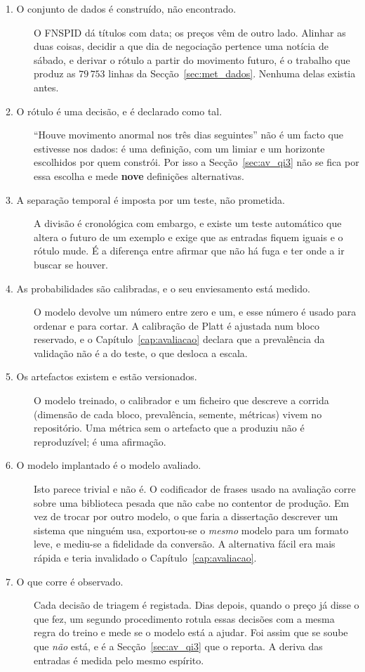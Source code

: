 \begin{description}
  \item[1. O conjunto de dados é construído, não encontrado.] O \gls{FNSPID} dá títulos com data;
        os preços vêm de outro lado. Alinhar as duas coisas, decidir a que dia de negociação
        pertence uma notícia de sábado, e derivar o rótulo a partir do movimento futuro, é o
        trabalho que produz as $79\,753$ linhas da Secção~\ref{sec:met_dados}. Nenhuma delas existia
        antes.

  \item[2. O rótulo é uma decisão, e é declarado como tal.] ``Houve movimento anormal nos três dias
        seguintes'' não é um facto que estivesse nos dados: é uma definição, com um limiar e um
        horizonte escolhidos por quem constrói. Por isso a Secção~\ref{sec:av_qi3} não se fica
        por essa escolha e mede \textbf{nove} definições alternativas.

  \item[3. A separação temporal é imposta por um teste, não prometida.] A divisão é cronológica com
        embargo, e existe um teste automático que altera o futuro de um exemplo e exige que as
        entradas fiquem iguais e o rótulo mude. É a diferença entre afirmar que não há fuga e ter
        onde a ir buscar se houver.

  \item[4. As probabilidades são calibradas, e o seu enviesamento está medido.] O modelo devolve um
        número entre zero e um, e esse número é usado para ordenar e para cortar. A calibração de
        Platt é ajustada num bloco reservado, e o Capítulo~\ref{cap:avaliacao} declara que a
        prevalência da validação não é a do teste, o que desloca a escala.

  \item[5. Os artefactos existem e estão versionados.] O modelo treinado, o calibrador e um ficheiro
        que descreve a corrida (dimensão de cada bloco, prevalência, semente, métricas) vivem
        no repositório. Uma métrica sem o artefacto que a produziu não é reproduzível; é uma
        afirmação.

  \item[6. O modelo implantado é o modelo avaliado.] Isto parece trivial e não é. O codificador de
        frases usado na avaliação corre sobre uma biblioteca pesada que não cabe no contentor de
        produção. Em vez de trocar por outro modelo, o que faria a dissertação descrever um
        sistema que ninguém usa, exportou-se o \emph{mesmo} modelo para um formato leve, e mediu-se
        a fidelidade da conversão. A alternativa fácil era mais rápida e teria invalidado o
        Capítulo~\ref{cap:avaliacao}.

  \item[7. O que corre é observado.] Cada decisão de triagem é registada. Dias depois, quando o
        preço já disse o que fez, um segundo procedimento rotula essas decisões com a mesma regra do
        treino e mede se o modelo está a ajudar. Foi assim que se soube que \emph{não} está, e é a
        Secção~\ref{sec:av_qi3} que o reporta. A deriva das entradas é medida pelo mesmo espírito.
\end{description}

